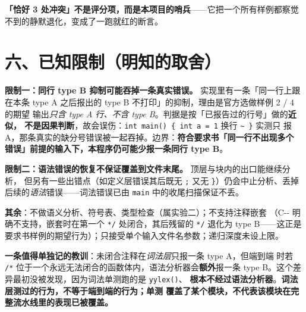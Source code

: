 \documentclass[11pt,a4paper]{ctexart}
\newcommand{\code}[1]{\texttt{#1}}
\begin{document}
\textbf{「恰好 3 处冲突」不是评分项，而是本项目的哨兵}——它把一个所有样例都察觉
不到的静默退化，变成了一跑就红的断言。

\section*{六、已知限制（明知的取舍）}

\textbf{限制一：同行 type B 抑制可能吞掉一条真实错误。} 实现里有一条「同一行上跟
在本条 type A 之后报出的 type B 不打印」的抑制，理由是官方选做样例 2 / 4 的期望
输出\emph{只含 type A 行、不含 type B}。判据是按「已报告过的行号」做的\textbf{近似，
不是因果判断}，故会误伤：\code{int main() \{ int a = 1} 换行 \code{\~{} \}} 实测只
报 A，那条真实的缺分号错误被一起吞掉。边界：\textbf{符合要求书「同一行不出现多个
错误」前提的输入下，本程序仍可能少报一条同行 type B}。

\textbf{限制二：语法错误的恢复不保证覆盖到文件末尾。} 顶层与块内的出口能继续分析，
但另有一些出错点（如定义层错误其后既无 \code{;} 又无 \code{\}}）仍会中止分析、丢掉
后续的\emph{语法}错误——词法错误已由 \code{main} 中的收尾扫描保证不丢。

\textbf{其余}：不做语义分析、符号表、类型检查（属实验二）；不支持注释嵌套
（C{-}{-} 明确不支持，嵌套时在第一个 \code{*/} 处闭合，其后残留的 \code{*/} 退化为
type B——这正是要求书样例的期望行为）；只接受单个输入文件名参数；递归深度未设上限。

\textbf{一条值得单独记的教训}：未闭合注释在\emph{词法层}只报一条 type A，但端到端
时若 \code{/*} 位于一个永远无法闭合的函数体内，语法分析器会\textbf{额外}报一条
type B。这个差异最初没被发现，因为词法单测跑的是 \code{yylex()}、
\textbf{根本不经过语法分析器}。\textbf{词法层测过的行为，不等于端到端的行为；单测
覆盖了某个模块，不代表该模块在完整流水线里的表现已被覆盖。}
\end{document}
